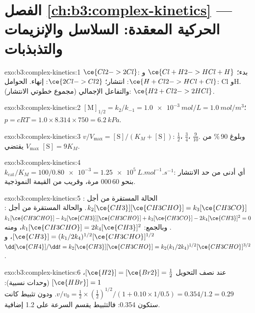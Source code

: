 \section*{الفصل \ref{ch:b3:complex-kinetics} --- الحركية المعقدة: السلاسل والإنزيمات والتذبذبات}

\begin{solution}{exo:b3:complex-kinetics:1}
$\ce{Cl2 -> 2 Cl}$: بدء؛ $\ce{Cl + H2 -> HCl + H}$ و$\ce{H + Cl2 -> HCl + Cl}$:
انتشار؛ $\ce{2 Cl -> Cl2}$: إنهاء. الحوامل: Cl وH. والتفاعل الإجمالي (مجموع
خطوتي الانتشار): $\ce{H2 + Cl2 -> 2 HCl}$.
\end{solution}

\begin{solution}{exo:b3:complex-kinetics:2}
$[\mathrm M]_{1/2} = k_2/k_{-1} = \qty{1.0e-3}{mol/L} = \qty{1.0}{mol/m^3}$؛ $p = cRT = 1.0 \times 8.314 \times 750 =
\qty{6.2}{kPa}$.
\end{solution}

\begin{solution}{exo:b3:complex-kinetics:3}
$v/V_{\max} = [\mathrm S]/(K_M + [\mathrm S])$: $\frac12$، $\frac34$، $\frac{9}{10}$. وبلوغ 90\,\% من $V_{\max}$ يقتضي $[\mathrm S] = 9K_M$.
\end{solution}

\begin{solution}{exo:b3:complex-kinetics:4}
$k_{\mathrm{cat}}/K_M = 100/\num{0.80e-3} = \qty{1.25e5}{L.mol^{-1}.s^{-1}}$: أي أدنى من حد الانتشار بنحو 60\,000
مرة، وقريب من القيمة النموذجية.
\end{solution}

\begin{solution}{exo:b3:complex-kinetics:5}
الحالة المستقرة من أجل : $k_2[\ce{CH3}][\ce{CH3CHO}] = k_3[\ce{CH3CO}]$. والحالة المستقرة من أجل :
$k_1[\ce{CH3CHO}] - k_2[\ce{CH3}][\ce{CH3CHO}] + k_3[\ce{CH3CO}] - 2k_4[\ce{CH3}]^2 = 0$. وبالجمع: $k_1[\ce{CH3CHO}] =
2k_4[\ce{CH3}]^2$، ومنه $[\ce{CH3}] = (k_1/2k_4)^{1/2}[\ce{CH3CHO}]^{1/2}$، و$\dd[\ce{CH4}]/\dd t = k_2[\ce{CH3}][\ce{CH3CHO}] =
k_2(k_1/2k_4)^{1/2}[\ce{CH3CHO}]^{3/2}$.
\end{solution}

\begin{solution}{exo:b3:complex-kinetics:6}
عند نصف التحويل $[\ce{H2}] = [\ce{Br2}] = \frac12$، $[\ce{HBr}] = 1$ (وحدات نسبية):
$v/v_0 = \frac12 \times (\frac12)^{1/2}/(1 + 0.10 \times 1/0.5) = 0.354/1.2 = 0.29$. ودون تثبيط كانت
ستكون 0.354: فالتثبيط يقسم السرعة على 1.2 إضافية.
\end{solution}


